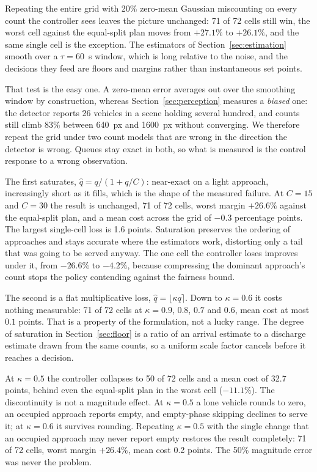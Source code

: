 \documentclass[journal]{IEEEtran}
\begin{document}
Repeating the entire grid with 20\% zero-mean Gaussian miscounting on every count the controller sees
leaves the picture unchanged: 71 of 72 cells still win, the worst cell against the equal-split plan
moves from $+27.1\%$ to $+26.1\%$, and the same single cell is the exception. The estimators of
Section~\ref{sec:estimation} smooth over a $\tau = 60$~s window, which is long relative to the noise,
and the decisions they feed are floors and margins rather than instantaneous set points.

That test is the easy one. A zero-mean error averages out over the smoothing window by
construction, whereas Section~\ref{sec:perception} measures a \emph{biased} one: the detector
reports 26 vehicles in a scene holding several hundred, and counts still climb 83\% between 640~px
and 1600~px without converging. We therefore repeat the grid under two count models that are wrong
in the direction the detector is wrong. Queues stay exact in both, so what is measured is the
control response to a wrong observation.

The first saturates, $\hat q = q/(1 + q/C)$: near-exact on a light approach, increasingly short as
it fills, which is the shape of the measured failure. At $C = 15$ and $C = 30$ the result is
unchanged, 71 of 72 cells, worst margin $+26.6\%$ against the equal-split plan, and a mean cost
across the grid of $-0.3$ percentage points. The largest single-cell loss is 1.6 points. Saturation
preserves the ordering of approaches and stays accurate where the estimators work, distorting only
a tail that was going to be served anyway. The one cell the controller loses improves under it,
from $-26.6\%$ to $-4.2\%$, because compressing the dominant approach's count stops the policy
contending against the fairness bound.

The second is a flat multiplicative loss, $\hat q = \lfloor \kappa q \rceil$. Down to $\kappa = 0.6$
it costs nothing measurable: 71 of 72 cells at $\kappa = 0.9$, $0.8$, $0.7$ and $0.6$, mean cost at
most $0.1$ points. That is a property of the formulation, not a lucky range. The degree of
saturation in Section~\ref{sec:floor} is a ratio of an arrival estimate to a discharge estimate
drawn from the same counts, so a uniform scale factor cancels before it reaches a decision.

At $\kappa = 0.5$ the controller collapses to 50 of 72 cells and a mean cost of 32.7 points, behind
even the equal-split plan in the worst cell ($-11.1\%$). The discontinuity is not a magnitude
effect. At $\kappa = 0.5$ a lone vehicle rounds to zero, an occupied approach reports empty, and
empty-phase skipping declines to serve it; at $\kappa = 0.6$ it survives rounding. Repeating
$\kappa = 0.5$ with the single change that an occupied approach may never report empty restores the
result completely: 71 of 72 cells, worst margin $+26.4\%$, mean cost 0.2 points. The 50\% magnitude
error was never the problem.
\end{document}
